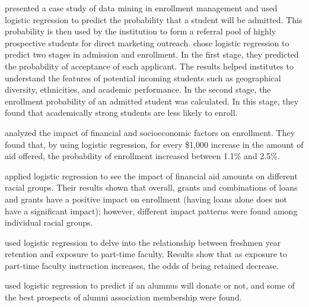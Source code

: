 \documentclass[12pt,english]{report}
\begin{document}
\citet{lr_1_chang} presented a case study of data mining in enrollment management and used logistic regression to predict the probability that a student will be admitted. This probability is then used by the institution to form a referral pool of highly prospective students for direct marketing outreach. \citet{lr_2} chose logistic regression to predict two stages in admission and enrollment. In the first stage, they predicted the probability of acceptance of each applicant. The results helped institutes to understand the features of potential incoming students such as geographical diversity, ethnicities, and academic performance. In the second stage, the enrollment probability of an admitted student was calculated. In this stage, they found that academically strong students are less likely to enroll.

\citet{braunstein1999measuring} analyzed the impact of  financial and socioeconomic factors on enrollment. They found that, by using logistic regression, for every \$1,000 increase in the amount of aid offered, the probability of enrollment increased between 1.1\% and 2.5\%.

\citet{lr_aid2} applied logistic regression to see the impact of financial aid amounts on different racial groups. Their results shown that overall, grants and combinations of loans and grants have a positive impact on enrollment (having loans alone does not have a significant impact); however, different impact patterns were found among individual racial groups.

\citet{lr_retention2} used logistic regression to delve into the relationship between freshmen year retention and exposure to part-time faculty. Results show that as exposure to part-time faculty instruction increases, the odds of being retained decrease.

\citet{lr_alumni1,lr_alumni2} used logistic regression to predict if an alumnus will donate or not, and some of the best prospects of alumni association membership were found. 

\end{document}
